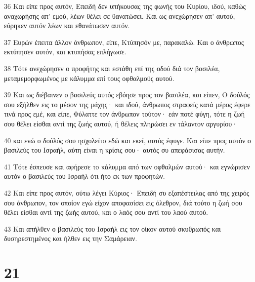 \par 36 Και είπε προς αυτόν, Επειδή δεν υπήκουσας της φωνής του Κυρίου, ιδού, καθώς αναχωρήσης απ' εμού, λέων θέλει σε θανατώσει. Και ως ανεχώρησεν απ' αυτού, εύρηκεν αυτόν λέων και εθανάτωσεν αυτόν.
\par 37 Ευρών έπειτα άλλον άνθρωπον, είπε, Κτύπησόν με, παρακαλώ. Και ο άνθρωπος εκτύπησεν αυτόν, και κτυπήσας επλήγωσε.
\par 38 Τότε ανεχώρησεν ο προφήτης και εστάθη επί της οδού διά τον βασιλέα, μεταμεμορφωμένος με κάλυμμα επί τους οφθαλμούς αυτού.
\par 39 Και ως διέβαινεν ο βασιλεύς αυτός εβόησε προς τον βασιλέα, και είπεν, Ο δούλός σου εξήλθεν εις το μέσον της μάχης· και ιδού, άνθρωπος στραφείς κατά μέρος έφερε τινά προς εμέ, και είπε, Φύλαττε τον άνθρωπον τούτον· εάν ποτέ φύγη, τότε η ζωή σου θέλει είσθαι αντί της ζωής αυτού, ή θέλεις πληρώσει εν τάλαντον αργυρίου·
\par 40 και ενώ ο δούλός σου ησχολείτο εδώ και εκεί, αυτός έφυγε. Και είπε προς αυτόν ο βασιλεύς του Ισραήλ, αύτη είναι η κρίσις σου· αυτός συ απεφάσισας αυτήν.
\par 41 Τότε έσπευσε και αφήρεσε το κάλυμμα από των οφθαλμών αυτού· και εγνώρισεν αυτόν ο βασιλεύς του Ισραήλ ότι ήτο εκ των προφητών.
\par 42 Και είπε προς αυτόν, ούτω λέγει Κύριος· Επειδή συ εξαπέστειλας από της χειρός σου άνθρωπον, τον οποίον εγώ είχον αποφασίσει εις όλεθρον, διά τούτο η ζωή σου θέλει είσθαι αντί της ζωής αυτού, και ο λαός σου αντί του λαού αυτού.
\par 43 Και απήλθεν ο βασιλεύς του Ισραήλ εις τον οίκον αυτού σκυθρωπός και δυσηρεστημένος και ήλθεν εις την Σαμάρειαν.

\chapter{21}


